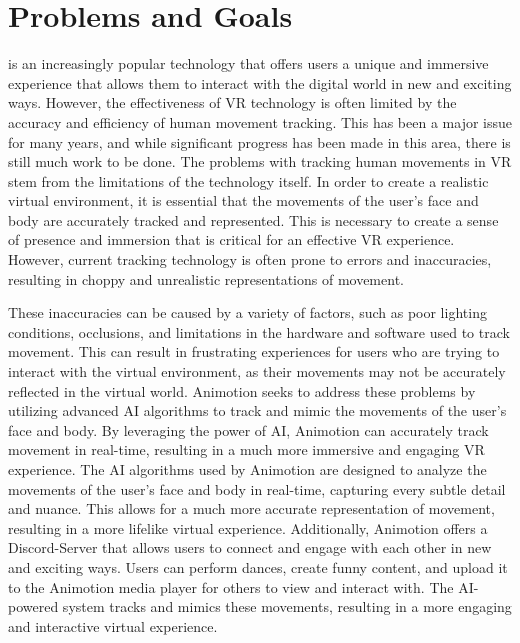 \section{Problems and Goals}
 is an increasingly popular technology that offers users a unique and immersive experience that allows them to interact with 
the digital world in new and exciting ways. However, the effectiveness of VR technology is often limited by the accuracy and efficiency of human 
movement tracking. This has been a major issue for many years, and while significant progress has been made in this area, there is still much 
work to be done. The problems with tracking human movements in VR stem from the limitations of the technology itself. In order to create a realistic virtual 
environment, it is essential that the movements of the user's face and body are accurately tracked and represented. This is necessary to 
create a sense of presence and immersion that is critical for an effective VR experience. However, current tracking technology is often prone 
to errors and inaccuracies, resulting in choppy and unrealistic representations of movement.

These inaccuracies can be caused by a variety of factors, such as poor lighting conditions, occlusions, and limitations in the 
hardware and software used to track movement. This can result in frustrating experiences for users who are trying to interact 
with the virtual environment, as their movements may not be accurately reflected in the virtual world.
Animotion seeks to address these problems by utilizing advanced AI algorithms to track and mimic the movements of the user's 
face and body. By leveraging the power of AI, Animotion can accurately track movement in real-time, resulting in a much more 
immersive and engaging VR experience. The AI algorithms used by Animotion are designed to analyze the movements of the user's face and body in real-time, capturing every 
subtle detail and nuance. This allows for a much more accurate representation of movement, resulting in a more lifelike virtual experience.
Additionally, Animotion offers a Discord-Server that allows users to connect and engage with each other in new and exciting ways. 
Users can perform dances, create funny content, and upload it to the Animotion media player for others to view and interact with. 
The AI-powered system tracks and mimics these movements, resulting in a more engaging and interactive virtual experience.
